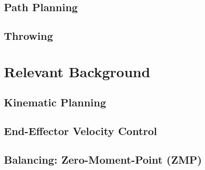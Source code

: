 		\subsection{Path Planning}\label{sec:srm}
		
		

		\subsection{Throwing}\label{sec:baseball}
		
		
		
%		
		
	\section{Relevant Background}\label{sec:background}
    		
    	
		\subsection{Kinematic Planning}
			
		\subsection{End-Effector Velocity Control}
			
%			
		\subsection{Balancing: Zero-Moment-Point (ZMP)}
			
	

%
%
%
%
%
%

%
%
%

%
%
%

